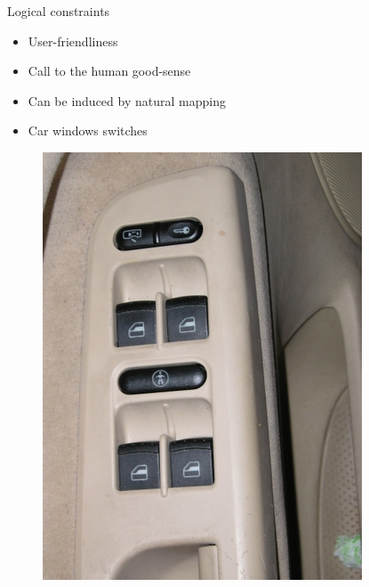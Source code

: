\documentclass{beamer}
\begin{document}
\begin{frame}{Logical constraints}
    \begin{itemize}
    		\item User-friendliness
    		\item Call to the human good-sense
            \item Can be induced by natural mapping
    		\item Car windows switches   
    \end{itemize}
     \begin{figure}
             \includegraphics[scale=0.25]{window.jpg}
             \end{figure}
\end{frame}
              
\end{document}
